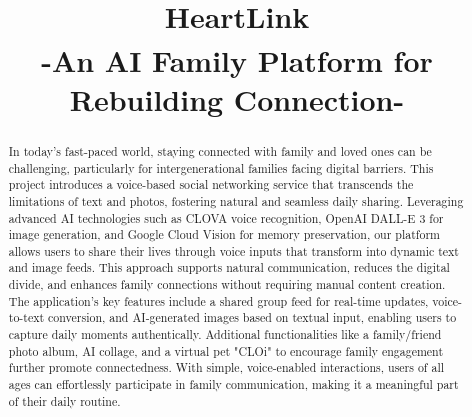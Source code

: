 \documentclass[conference]{IEEEtran}
\begin{document}
\title{HeartLink \\
    {\textsuperscript{}-An AI Family Platform for Rebuilding Connection-}
    }

\author{
\and
{}
\and
{}
\and
{}
}

\maketitle

\begin{abstract}
In today's fast-paced world, staying connected with family and loved ones can be challenging, particularly for intergenerational families facing digital barriers. This project introduces a voice-based social networking service that transcends the limitations of text and photos, fostering natural and seamless daily sharing. Leveraging advanced AI technologies such as CLOVA voice recognition, OpenAI DALL-E 3 for image generation, and Google Cloud Vision for memory preservation, our platform allows users to share their lives through voice inputs that transform into dynamic text and image feeds. This approach supports natural communication, reduces the digital divide, and enhances family connections without requiring manual content creation.\\

The application's key features include a shared group feed for real-time updates, voice-to-text conversion, and AI-generated images based on textual input, enabling users to capture daily moments authentically. Additional functionalities like a family/friend photo album, AI collage, and a virtual pet "CLOi" to encourage family engagement further promote connectedness. With simple, voice-enabled interactions, users of all ages can effortlessly participate in family communication, making it a meaningful part of their daily routine.
\end{abstract}
\end{document}
